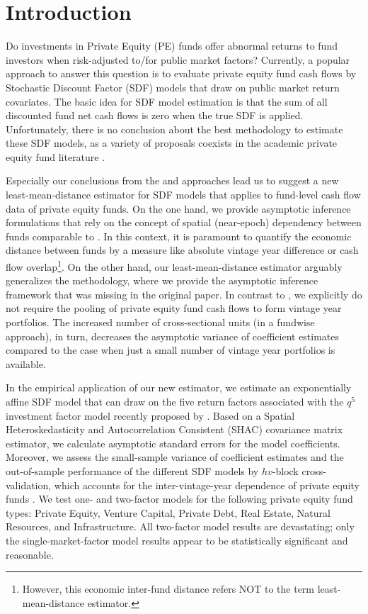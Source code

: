 \documentclass[12pt]{article}
\begin{document}
\section{Introduction}

Do investments in Private Equity (PE) funds offer abnormal returns to fund investors when risk-adjusted to/for public market factors?
Currently, a popular approach to answer this question is to evaluate private equity fund cash flows by Stochastic Discount Factor (SDF) models that draw on public market return covariates.
The basic idea for SDF model estimation is that the sum of all discounted fund net cash flows is zero when the true SDF is applied.
Unfortunately, there is no conclusion about the best methodology to estimate these SDF models, as a variety of proposals coexists in the academic private equity fund literature \citep{DLP12,KN16,ACGP18,GSW19}.


Especially our conclusions from the \cite{DLP12} and \cite{KN16} approaches lead us to suggest a new least-mean-distance estimator for SDF models that applies to fund-level cash flow data of private equity funds.
On the one hand, we provide asymptotic inference formulations that rely on the concept of spatial (near-epoch) dependency between funds comparable to \cite{KN16}.
In this context, it is paramount to quantify the economic distance between funds by a measure like absolute vintage year difference or cash flow overlap\footnote{However, this economic inter-fund distance refers NOT to the term least-mean-distance estimator.}.
On the other hand, our least-mean-distance estimator arguably generalizes the \cite{DLP12} methodology, where we provide the asymptotic inference framework that was missing in the original paper.
In contrast to \cite{DLP12}, we explicitly do not require the pooling of private equity fund cash flows to form vintage year portfolios.
The increased number of cross-sectional units (in a fundwise approach), in turn, decreases the asymptotic variance of coefficient estimates compared to the case when just a small number of vintage year portfolios is available.

In the empirical application of our new estimator, we estimate an exponentially affine SDF model that can draw on the five return factors associated with the $q^5$ investment factor model recently proposed by \cite{HXZ20}.
Based on a Spatial Heteroskedasticity and Autocorrelation Consistent (SHAC) covariance matrix estimator, we calculate asymptotic standard errors for the model coefficients.
Moreover, we assess the small-sample variance of coefficient estimates and the out-of-sample performance of the different SDF models by $hv$-block cross-validation, which accounts for the inter-vintage-year dependence of private equity funds \citep{R00}.
We test one- and two-factor models for the following private equity fund types: Private Equity, Venture Capital, Private Debt, Real Estate, Natural Resources, and Infrastructure.
All two-factor model results are devastating; only the single-market-factor model results appear to be statistically significant and reasonable.
\end{document}
